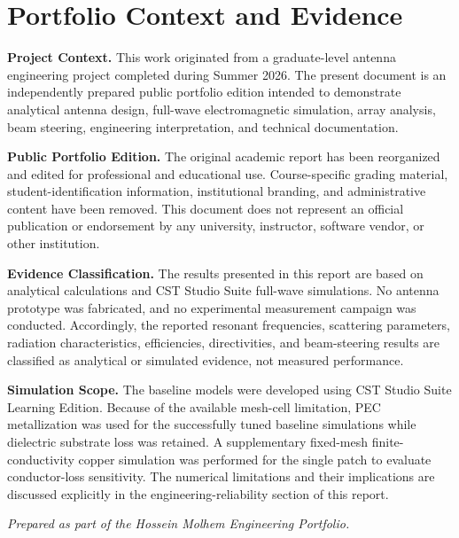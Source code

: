 
\chapter*{Portfolio Context and Evidence}
\thispagestyle{fancy}

\noindent
\textbf{Project Context.}
This work originated from a graduate-level antenna engineering project
completed during Summer 2026. The present document is an independently
prepared public portfolio edition intended to demonstrate analytical
antenna design, full-wave electromagnetic simulation, array analysis,
beam steering, engineering interpretation, and technical documentation.

\vspace{0.5em}

\noindent
\textbf{Public Portfolio Edition.}
The original academic report has been reorganized and edited for
professional and educational use. Course-specific grading material,
student-identification information, institutional branding, and
administrative content have been removed. This document does not
represent an official publication or endorsement by any university,
instructor, software vendor, or other institution.

\vspace{0.5em}

\noindent
\textbf{Evidence Classification.}
The results presented in this report are based on analytical calculations
and CST Studio Suite full-wave simulations. No antenna prototype was
fabricated, and no experimental measurement campaign was conducted.
Accordingly, the reported resonant frequencies, scattering parameters,
radiation characteristics, efficiencies, directivities, and
beam-steering results are classified as analytical or simulated evidence,
not measured performance.

\vspace{0.5em}

\noindent
\textbf{Simulation Scope.}
The baseline models were developed using CST Studio Suite Learning
Edition. Because of the available mesh-cell limitation, PEC
metallization was used for the successfully tuned baseline simulations
while dielectric substrate loss was retained. A supplementary
fixed-mesh finite-conductivity copper simulation was performed for the
single patch to evaluate conductor-loss sensitivity. The numerical
limitations and their implications are discussed explicitly in the
engineering-reliability section of this report.

\vfill

\begin{center}
    \textit{Prepared as part of the Hossein Molhem Engineering Portfolio.}
\end{center}
